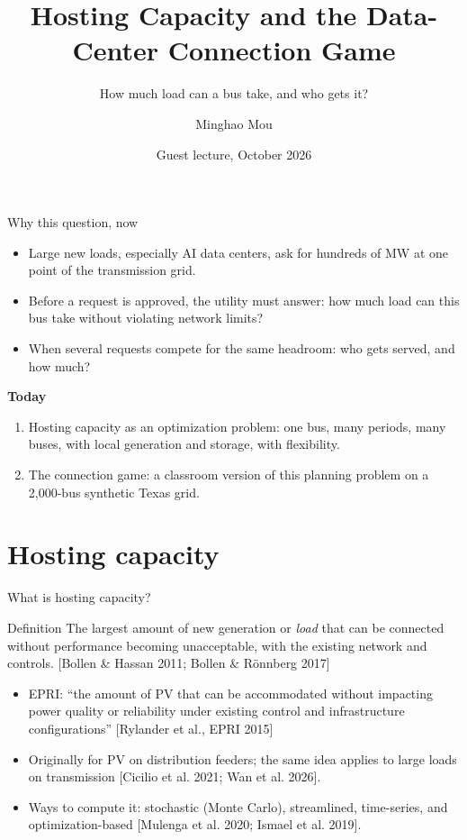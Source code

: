 \documentclass[aspectratio=169,11pt]{beamer}
\title{Hosting Capacity and the Data-Center Connection Game}
\subtitle{How much load can a bus take, and who gets it?}
\author{Minghao Mou}
\institute{Elmore Family School of Electrical and Computer Engineering, Purdue University}
\date{Guest lecture, October 2026}
\newcommand{\src}[1]{{\scriptsize\color{PurdueSteel}[#1]}}
\begin{document}
\maketitle

\begin{frame}{Why this question, now}
  \begin{itemize}
    \item Large new loads, especially AI data centers, ask for hundreds of MW at
      one point of the transmission grid.
    \item Before a request is approved, the utility must answer:
      \alert{how much load can this bus take without violating network limits?}
    \item When several requests compete for the same headroom:
      \alert{who gets served, and how much?}
  \end{itemize}
  \vspace{0.6em}
  \textbf{Today}
  \begin{enumerate}
    \item Hosting capacity as an optimization problem: one bus, many periods,
      many buses, with local generation and storage, with flexibility.
    \item The connection game: a classroom version of this planning problem on a
      2{,}000-bus synthetic Texas grid.
  \end{enumerate}
\end{frame}

\section{Hosting capacity}

\begin{frame}{What is hosting capacity?}
  \begin{block}{Definition}
    The largest amount of new generation or \emph{load} that can be connected
    without performance becoming unacceptable, with the existing network and
    controls.
    \src{Bollen \& Hassan 2011; Bollen \& R\"onnberg 2017}
  \end{block}
  \begin{itemize}
    \item EPRI: ``the amount of PV that can be accommodated without impacting
      power quality or reliability under existing control and infrastructure
      configurations'' \src{Rylander et al., EPRI 2015}
    \item Originally for PV on distribution feeders; the same idea applies to
      large loads on transmission \src{Cicilio et al. 2021; Wan et al. 2026}.
    \item Ways to compute it: stochastic (Monte Carlo), streamlined, time-series,
      and \alert{optimization-based} \src{Mulenga et al. 2020; Ismael et al. 2019}.
  \end{itemize}
\end{frame}
\end{document}
